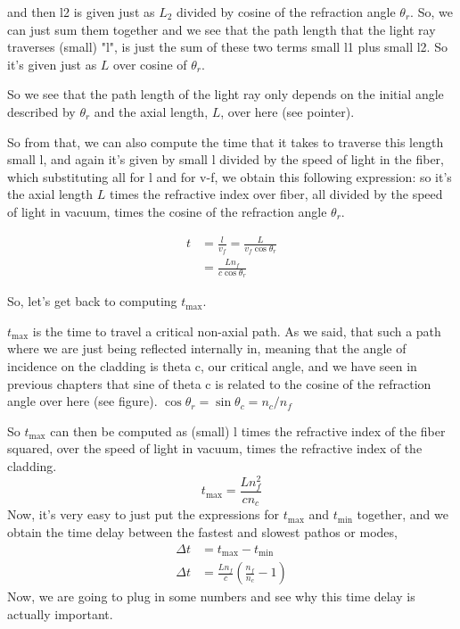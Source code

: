 and then l2 is given just as $L_2$ divided by cosine of the refraction angle $\theta_r$. So, we can just sum them together and we see that the path length that the light ray traverses (small) "l", is just the sum of these two terms small l1 plus small l2. So it's given just as $L$ over cosine of $\theta_r$.

So we see that the path length of the light ray only depends on the initial angle described by $\theta_r$ and the axial length, $L$, over here (see pointer).

So from that, we can also compute the time that it takes to traverse this length small l, and again it's given by small l divided by the speed of light in the fiber, which substituting all for l and for v-f, we obtain this following expression: so it's the axial length $L$ times the refractive index over fiber, all divided by the speed of light in vacuum, times the cosine of the refraction angle $\theta_r$.

\begin{equation}
\begin{aligned}
t &=\frac{l}{v_f}=\frac{L}{v_f \cos \theta_r} \\
&=\frac{L n_f}{c \cos \theta_r}
\end{aligned}
\end{equation}

So, let's get back to computing $t_{\mathrm{max}}$.

$t_{\mathrm{max}}$ is the time to travel a critical non-axial path. As we said, that such a path where we are just being reflected internally in, meaning that the angle of incidence on the cladding is theta c, our critical angle, and we have seen in previous chapters that sine of theta c is related to the cosine of the refraction angle over here (see figure). $\cos \theta_r=\sin \theta_c=n_c / n_f$

So $t_{\mathrm{max}}$ can then be computed as (small) l times the refractive index of the fiber squared, over the speed of light in vacuum, times the refractive index of the cladding. 
\begin{equation}
t_{\max }=\frac{L n_f^2}{c n_c}
\end{equation}
Now, it's very easy to just put the expressions for $t_{\mathrm{max}}$ and $t_{\mathrm{min}}$ together, and we obtain the time delay between the fastest and slowest pathos or modes, 
\begin{equation}
\begin{aligned}
\Delta t &=t_{\max }-t_{\min } \\
\Delta t &=\frac{L n_f}{c}\left(\frac{n_f}{n_c}-1\right)
\end{aligned}
\end{equation}
Now, we are going to plug in some numbers and see why this time delay is actually important.

